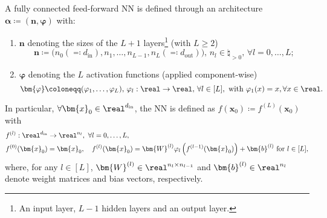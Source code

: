 \begin{definition} \label{def:nn}
    A fully connected feed-forward NN is defined through an architecture $\bm{\alpha} \coloneqq (\bm{n}, \bm{\varphi})$ with:
    \begin{enumerate}
        \item $\bm{n}$ denoting the sizes of the $L + 1$ layers\footnote{An input layer, $L - 1$ hidden layers and an output layer.} (with $L \geq 2$)
        \begin{equation*}
            \bm{n} \coloneqq \big(n_0 (\eqcolon d_{\mathrm{in}}), n_1, \dots, n_{L - 1}, n_L (\eqcolon d_{\mathrm{out}})\big), \, n_l \in \natural_{> 0}, \, \forall l = 0, \dots, L;
        \end{equation*}		
        \item $\bm{\varphi}$ denoting the $L$ activation functions (applied component-wise)
        \begin{equation*}
            \bm{\varphi} \coloneqq (\varphi_1, \dots, \varphi_L), \, \varphi_l: \real \to \real, \, \forall l \in [L], \text{ with } \varphi_1(x) = x, \forall x \in \real.
        \end{equation*}
    \end{enumerate}
    In particular, $\forall \bm{x}_0 \in \real^{d_{\mathrm{in}}}$, the NN is defined as $f(\bm{x}_0) \coloneqq f^{(L)}(\bm{x}_0)$ with
    \begin{equation} \label{eq:nn}
        \begin{aligned}
            & f^{(l)}: \real^{d_{\mathrm{in}}} \to \real^{n_l}, \ \forall l = 0, \dots, L, \\
            & f^{(0)}(\bm{x}_0) = \bm{x}_0, \quad f^{(l)}(\bm{x}_0) = \bm{W}^{(l)} \varphi_l\left(f^{(l - 1)}(\bm{x}_0)\right) + \bm{b}^{(l)} \text{ for } l \in [L], \\
        \end{aligned}
    \end{equation}
    where, for any $l \in [L]$, $\bm{W}^{(l)} \in \real^{n_l \times n_{l - 1}}$ and $\bm{b}^{(l)} \in \real^{n_l}$ denote weight matrices and bias vectors, respectively.
\end{definition}


